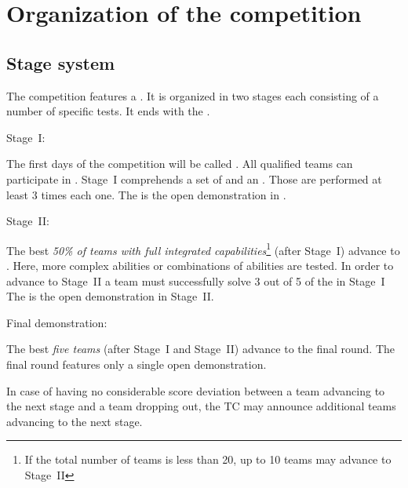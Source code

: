 \section{Organization of the competition}\label{sec:procedure_during_competition}

\subsection{Stage system}\label{rule:stages}

The competition features a . 
It is organized in two stages each consisting of a number of specific tests. 
It ends with the .

\begin{enumerate}
{\bf\item Stage~I:} The first days of the competition will be called . 
  All qualified teams can participate in .
  Stage~I comprehends a set of  and an . Those  are performed at least 3 times each one.
  The  is the open demonstration in .

{\bf\item Stage~II:} The best \emph{50\% of teams with full integrated capabilities}\footnote{If the total number of teams is less than 20, up to 10 teams may advance to Stage~II} (after Stage~I) advance to . 
  Here, more complex abilities or combinations of abilities are tested. 
  In order to advance to Stage~II a team must successfully solve 3 out of 5 of the  in Stage~I
  The  is the open demonstration in Stage~II.
{\bf\item Final demonstration:} The best \emph{five teams} (after Stage~I and Stage~II) advance to the final round. 
  The final round features only a single open demonstration.
\end{enumerate}
In case of having no considerable score deviation between a team advancing to the next stage and a team dropping out, the TC may announce additional teams advancing to the next stage.


